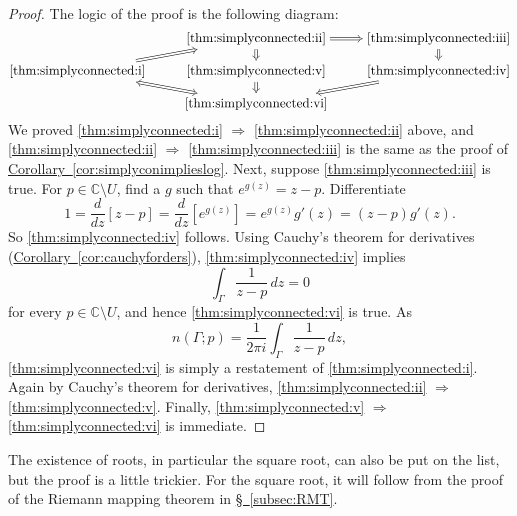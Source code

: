 \documentclass[12pt,openany]{book}
\newcommand{\C}{{\mathbb{C}}}
\theoremstyle{plain}
\theoremstyle{remark}
\theoremstyle{definition}
\theoremstyle{exercise}
\theoremstyle{example}
\newcommand{\subsectionref}[1]{\hyperref[#1]{\S~\ref*{#1}}}
\newcommand{\corref}[1]{\hyperref[#1]{Corollary~\ref*{#1}}}
\begin{document}
\begin{proof}
The logic of the proof is the following diagram:
\begin{equation*}
\begin{tikzcd}[cramped, row sep=small]
& \text{\ref{thm:simplyconnected:ii}} \arrow[d, Rightarrow] \arrow[r, Rightarrow] &
\text{\ref{thm:simplyconnected:iii}} \arrow[d, Rightarrow] \\
\text{\ref{thm:simplyconnected:i}} \arrow[ur, Rightarrow] & 
\text{\ref{thm:simplyconnected:v}} \arrow[d, Rightarrow] &
\text{\ref{thm:simplyconnected:iv}} \arrow[dl, Rightarrow] \\
& \text{\ref{thm:simplyconnected:vi}} \arrow[ul, Leftrightarrow] &
\end{tikzcd}
\end{equation*}
We proved
\ref{thm:simplyconnected:i} $\Rightarrow$
\ref{thm:simplyconnected:ii} above,
and
\ref{thm:simplyconnected:ii} $\Rightarrow$
\ref{thm:simplyconnected:iii}
is the same as the proof of \corref{cor:simplyconimplieslog}.
Next, suppose \ref{thm:simplyconnected:iii} is true.  For
$p \in \C \setminus U$, find a $g$ such that
$e^{g(z)} = z-p$.
Differentiate
\begin{equation*}
1 = 
\frac{d}{dz} \left[
z-p
\right]
=
\frac{d}{dz} \left[
e^{g(z)}
\right]
=
e^{g(z)} g'(z)
=
(z-p) g'(z) .
\end{equation*}
So \ref{thm:simplyconnected:iv} follows.
Using Cauchy's theorem for derivatives (\corref{cor:cauchyforders}),
\ref{thm:simplyconnected:iv} implies
\begin{equation*}
\int_\Gamma \frac{1}{z-p} \, dz = 0 
\end{equation*}
for every $p \in \C \setminus U$,
and hence 
\ref{thm:simplyconnected:vi} is true.
As 
\begin{equation*}
n(\Gamma;p) = 
\frac{1}{2\pi i}
\int_\Gamma \frac{1}{z-p} \, dz ,
\end{equation*}
\ref{thm:simplyconnected:vi} is simply a restatement of
\ref{thm:simplyconnected:i}.
Again by Cauchy's theorem for derivatives,
\ref{thm:simplyconnected:ii} $\Rightarrow$
\ref{thm:simplyconnected:v}.
Finally, \ref{thm:simplyconnected:v} $\Rightarrow$
\ref{thm:simplyconnected:vi} is immediate.
\end{proof}

The existence of roots, in particular the square root, can also be put on
the list, but the proof is a little trickier.  For the square root, it will
follow from the proof of the Riemann mapping theorem in 
\subsectionref{subsec:RMT}.
\end{document}
